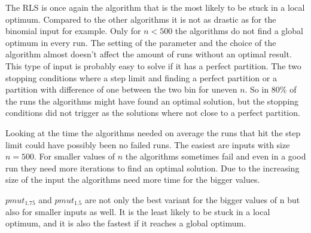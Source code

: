 

The RLS is once again the algorithm that is the most likely to be stuck in a local optimum.
Compared to the other algorithms it is not as drastic as for the binomial input for example.
Only for $n<500$ the algorithms do not find a global optimum in every run.
The setting of the parameter and the choice of the algorithm almost doesn't affect the amount of runs without an optimal result.
This type of input is probably easy to solve if it has a perfect partition.
The two stopping conditions where a step limit and finding a perfect partition or a partition with difference of one between the two bin for uneven $n$.
So in 80\% of the runs the algorithms might have found an optimal solution, but the stopping conditions did not trigger as the solutions where not close to a perfect partition.



Looking at the time the algorithms needed on average the runs that hit the step limit could have possibly been no failed runs.
The easiest are inputs with size $n=500$.
For smaller values of $n$ the algorithms sometimes fail and even in a good run they need more iterations to find an optimal solution.
Due to the increasing size of the input the algorithms need more time for the bigger values.



$pmut_{1.75}$ and $pmut_{1.5}$ are not only the best variant for the bigger values of n but also for smaller inputs as well.
It is the least likely to be stuck in a local optimum, and it is also the fastest if it reaches a global optimum.

